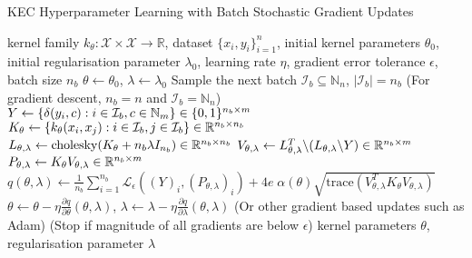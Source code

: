 \documentclass{article}
\begin{document}
	\begin{algorithm}[tb]
		\caption{KEC Hyperparameter Learning with Batch Stochastic Gradient Updates}
		\label{alg:kernel_embedding_classifier_training}
		\begin{algorithmic}[1]
			 kernel family $k_{\theta} : \mathcal{X} \times \mathcal{X} \to \mathbb{R}$, dataset $\{x_{i}, y_{i}\}_{i = 1}^{n}$, initial kernel parameters $\theta_{0}$, initial regularisation parameter $\lambda_{0}$, learning rate $\eta$, gradient error tolerance $\epsilon$, batch size $n_{b}$
			\STATE $\theta \leftarrow \theta_{0}$, $\lambda \leftarrow \lambda_{0}$
			\REPEAT
			\STATE Sample the next batch $\mathcal{I}_{b} \subseteq \mathbb{N}_{n}$, $| \mathcal{I}_{b} | = n_{b}$ \hspace{\fill} (For gradient descent, $n_{b} = n$ and $\mathcal{I}_{b} = \mathbb{N}_{n}$)
			\STATE $Y \leftarrow \{\delta(y_{i}, c) : i \in \mathcal{I}_{b}, c \in \mathbb{N}_{m}\} \hspace{\fill} \in \{0, 1\}^{n_{b} \times m}$
			\STATE $K_{\theta} \leftarrow \{k_{\theta}(x_{i}, x_{j}) : i \in \mathcal{I}_{b}, j \in \mathcal{I}_{b}\} \hspace{\fill} \in \mathbb{R}^{n_{b} \times n_{b}}$
			\STATE $L_{\theta, \lambda} \leftarrow \mathrm{cholesky}(K_{\theta} + n_{b} \lambda I_{n_{b}}) \hspace{\fill} \in \mathbb{R}^{n_{b} \times n_{b}}$
			\STATE $V_{\theta, \lambda} \leftarrow L_{\theta, \lambda}^{T} \backslash (L_{\theta, \lambda} \backslash Y) \hspace{\fill} \in \mathbb{R}^{n_{b} \times m}$
			\STATE $P_{\theta, \lambda} \leftarrow K_{\theta} V_{\theta, \lambda} \hspace{\fill} \in \mathbb{R}^{n_{b} \times m}$
			\STATE $q(\theta, \lambda) \leftarrow \frac{1}{n_{b}} \sum_{i = 1}^{n_{b}} \mathcal{L}_{\epsilon}((Y)_{i}, (P_{\theta, \lambda})_{i}) + 4 e \; \alpha(\theta) \sqrt{\mathrm{trace}(V_{\theta, \lambda}^{T} K_{\theta} V_{\theta, \lambda})}$
			\STATE $\theta \leftarrow \theta - \eta \frac{\partial q}{\partial \theta}(\theta, \lambda)$, $\lambda \leftarrow \lambda - \eta \frac{\partial q}{\partial \lambda}(\theta, \lambda)$ \hspace{\fill} (Or other gradient based updates such as Adam)
			 \hspace{\fill} (Stop if magnitude of all gradients are below $\epsilon$)
			 kernel parameters $\theta$, regularisation parameter $\lambda$
		\end{algorithmic}
	\end{algorithm}
\end{document}
